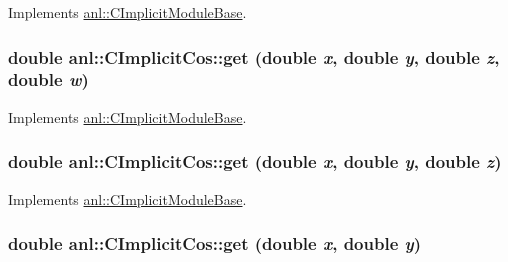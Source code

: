 Implements \hyperlink{classanl_1_1CImplicitModuleBase_aa40b7d54572197612a4fea44b63447eb}{anl::CImplicitModuleBase}.\hypertarget{classanl_1_1CImplicitCos_aa9326ba121ca49ae6caf52e7143020a7}{
\subsubsection[{get}]{\setlength{\rightskip}{0pt plus 5cm}double anl::CImplicitCos::get (double {\em x}, \/  double {\em y}, \/  double {\em z}, \/  double {\em w})}}
\label{classanl_1_1CImplicitCos_aa9326ba121ca49ae6caf52e7143020a7}


Implements \hyperlink{classanl_1_1CImplicitModuleBase_a3cf520bdab59631864253c03b4e1723f}{anl::CImplicitModuleBase}.\hypertarget{classanl_1_1CImplicitCos_a4b8b0150cfffc6e066fc4e62cb2dd33e}{
\subsubsection[{get}]{\setlength{\rightskip}{0pt plus 5cm}double anl::CImplicitCos::get (double {\em x}, \/  double {\em y}, \/  double {\em z})}}
\label{classanl_1_1CImplicitCos_a4b8b0150cfffc6e066fc4e62cb2dd33e}


Implements \hyperlink{classanl_1_1CImplicitModuleBase_ac17d592612c82ba3d47f9229a00b1fe3}{anl::CImplicitModuleBase}.\hypertarget{classanl_1_1CImplicitCos_ad17b40e7a1bfee39e5c0bd103154cc22}{
\subsubsection[{get}]{\setlength{\rightskip}{0pt plus 5cm}double anl::CImplicitCos::get (double {\em x}, \/  double {\em y})}}
\label{classanl_1_1CImplicitCos_ad17b40e7a1bfee39e5c0bd103154cc22}


